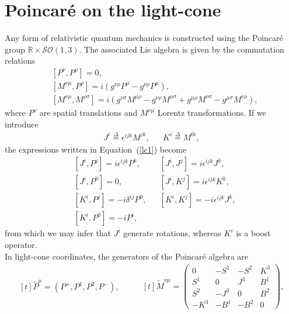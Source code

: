 \section{Poincar\'e on the light-cone}
Any form of relativistic quantum mechanics is constructed using the Poincar\'e group $\mathbb{R}\times \mathcal{SO}(1,3)$. The associated Lie algebra is given by the commutation relations
\begin{equation}
\label{lc1}
\begin{aligned}
&[P^\nu,P^\mu]=0,\\
&[M^{\nu\mu},P^\rho]=i(g^{\nu\rho}P^\mu-g^{\nu\rho}P^\mu),\\
&[M^{\nu\mu},M^{\rho\sigma}]=i(g^{\nu\sigma}M^{\mu\rho}-g^{\nu\rho}M^{\mu\sigma}+g^{\mu\rho}M^{\nu\sigma}-g^{\mu\sigma}M^{\nu\rho}),
\end{aligned}
\end{equation}
where $P^\nu$ are spatial translations and $M^{\nu\mu}$ Lorentz transformations. If we introduce
\begin{align*}
J^i\overset{\Delta}{=}\epsilon^{ijk}M^{jk}, && K^i\overset{\Delta}{=}M^{0i},
\end{align*}
the expressions written in Equation~(\cref{lc1}) become
\begin{equation*}
\begin{aligned}
&[J^i,P^j]=i\epsilon^{ijk}P^k, && [J^i,J^j]=i\epsilon^{ijk}J^k,\\ 
&[J^i,P^0]=0, && [J^i,K^j]=i\epsilon^{ijk}K^k, \\ 
&[K^i,P^j]=-i\delta^{ij}P^0, && [K^i,K^j]=-i\epsilon^{ijk}J^k, \\ 
&[K^i,P^0]=-iP^i,
\end{aligned}
\end{equation*}
from which we may infer that $J^i$ generate rotations, whereas $K^i$ is a boost operator. \\
In light-cone coordinates, the generators of the Poincar\'e algebra are \cite{qedimf}
\begin{equation}
\label{lc2}
\begin{aligned}[t]
\widetilde{P}^\mu=(P^+,P^1,P^2,P^-),
\end{aligned}
\qquad
\begin{aligned}[t]
\widetilde{M}^{\nu\mu}=\left( \begin{array}{cccc}
0 & -S^1  & -S^2  & K^3\\
 S^1 &    0 &  J^3 & B^1\\
 S^2 & -J^3 &    0 & B^2\\
-K^3 & -B^1 & -B^2 &   0\end{array} \right),
\end{aligned}
\end{equation}
